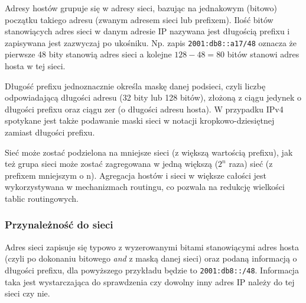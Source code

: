 \documentclass{pdfBooklets}
\begin{document}
Adresy hostów grupuje się w adresy sieci, bazując na jednakowym (bitowo) początku takiego adresu (zwanym adresem sieci lub prefixem). Ilość bitów stanowiących adres sieci w danym adresie IP nazywana jest długością prefixu i zapisywana jest zazwyczaj po ukośniku. Np. zapis \Verb$2001:db8::a17/48$ oznacza że pierwsze 48 bity stanowią adres sieci a kolejne $128-48 = 80$ bitów stanowi adres hosta w tej sieci.

Długość prefixu jednoznacznie określa maskę danej podsieci, czyli liczbę odpowiadającą długości adresu (32 bity lub 128 bitów), złożoną z ciągu jedynek o długości prefixu oraz ciągu zer (o długości adresu hosta). W przypadku IPv4 spotykane jest także podawanie maski sieci w notacji kropkowo-dziesiętnej zamiast długości prefixu.

Sieć może zostać podzielona na mniejsze sieci (z większą wartością prefixu), jak też grupa sieci może zostać zagregowana w jedną większą ($2^n$ raza) sieć (z prefixem mniejszym o n). Agregacja hostów i sieci w większe całości jest wykorzystywana w mechanizmach routingu, co pozwala na redukcję wielkości tablic routingowych.

\subsubsection{Przynależność do sieci}
Adres sieci zapisuje się typowo z wyzerowanymi bitami stanowiącymi adres hosta (czyli po dokonaniu bitowego \emph{and} z maską danej sieci) oraz podaną informacją o długości prefixu, dla powyższego przykładu będzie to \Verb$2001:db8::/48$. Informacja taka jest wystarczająca do sprawdzenia czy dowolny inny adres IP należy do tej sieci czy nie.
\end{document}

